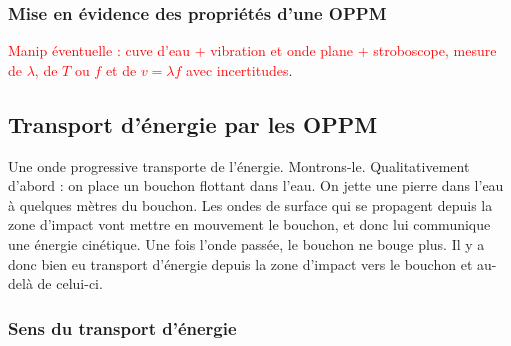 \documentclass[11pt,a4paper]{report}
\begin{document}
%
%

\subsubsection{Mise en évidence des propriétés d'une OPPM}

\textcolor{red}{Manip éventuelle : cuve d'eau + vibration et onde plane + stroboscope, mesure de $\lambda$, de $T$ ou $f$ et de $v = \lambda f$ avec incertitudes}.

\subsection{Transport d'énergie par les OPPM}

Une onde progressive transporte de l'énergie. Montrons-le. Qualitativement d'abord : on place un bouchon flottant dans l'eau. On jette une pierre dans l'eau à quelques mètres du bouchon. Les ondes de surface qui se propagent depuis la zone d'impact vont mettre en mouvement le bouchon, et donc lui communique une énergie cinétique. Une fois l'onde passée, le bouchon ne bouge plus. Il y a donc bien eu transport d'énergie depuis la zone d'impact vers le bouchon et au-delà de celui-ci.\\

\subsubsection{Sens du transport d'énergie}
\end{document}
